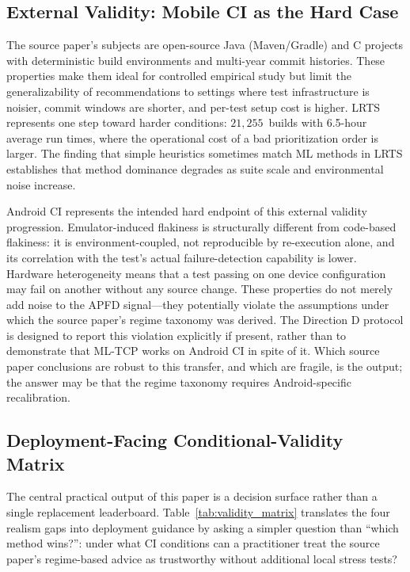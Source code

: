 \documentclass[10pt,conference]{IEEEtran}
\begin{document}
\subsection{External Validity: Mobile CI as the Hard Case}

The source paper's subjects are open-source Java (Maven/Gradle) and C projects with deterministic build environments and multi-year commit histories. These properties make them ideal for controlled empirical study but limit the generalizability of recommendations to settings where test infrastructure is noisier, commit windows are shorter, and per-test setup cost is higher. LRTS represents one step toward harder conditions: $21{,}255$~builds with 6.5-hour average run times, where the operational cost of a bad prioritization order is larger. The finding that simple heuristics sometimes match ML methods in LRTS establishes that method dominance degrades as suite scale and environmental noise increase.

Android CI represents the intended hard endpoint of this external validity progression. Emulator-induced flakiness is structurally different from code-based flakiness: it is environment-coupled, not reproducible by re-execution alone, and its correlation with the test's actual failure-detection capability is lower. Hardware heterogeneity means that a test passing on one device configuration may fail on another without any source change. These properties do not merely add noise to the APFD signal---they potentially violate the assumptions under which the source paper's regime taxonomy was derived. The Direction D protocol is designed to report this violation explicitly if present, rather than to demonstrate that ML-TCP works on Android CI in spite of it. Which source paper conclusions are robust to this transfer, and which are fragile, is the output; the answer may be that the regime taxonomy requires Android-specific recalibration.

\subsection{Deployment-Facing Conditional-Validity Matrix}\label{subsec:deployment_matrix}

The central practical output of this paper is a decision surface rather than a single replacement leaderboard. Table~\ref{tab:validity_matrix} translates the four realism gaps into deployment guidance by asking a simpler question than ``which method wins?'': under what CI conditions can a practitioner treat the source paper's regime-based advice as trustworthy without additional local stress tests?
\end{document}
